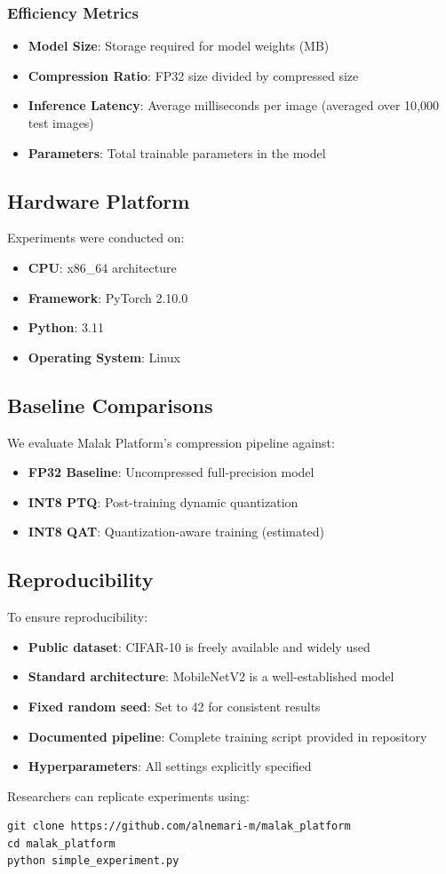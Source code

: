 \subsubsection{Efficiency Metrics}
\begin{itemize}
\item \textbf{Model Size}: Storage required for model weights (MB)
\item \textbf{Compression Ratio}: FP32 size divided by compressed size
\item \textbf{Inference Latency}: Average milliseconds per image (averaged over 10,000 test images)
\item \textbf{Parameters}: Total trainable parameters in the model
\end{itemize}

\subsection{Hardware Platform}

Experiments were conducted on:
\begin{itemize}
\item \textbf{CPU}: x86\_64 architecture
\item \textbf{Framework}: PyTorch 2.10.0
\item \textbf{Python}: 3.11
\item \textbf{Operating System}: Linux
\end{itemize}

\subsection{Baseline Comparisons}

We evaluate Malak Platform's compression pipeline against:
\begin{itemize}
\item \textbf{FP32 Baseline}: Uncompressed full-precision model
\item \textbf{INT8 PTQ}: Post-training dynamic quantization
\item \textbf{INT8 QAT}: Quantization-aware training (estimated)
\end{itemize}

\subsection{Reproducibility}

To ensure reproducibility:
\begin{itemize}
\item \textbf{Public dataset}: CIFAR-10 is freely available and widely used
\item \textbf{Standard architecture}: MobileNetV2 is a well-established model
\item \textbf{Fixed random seed}: Set to 42 for consistent results
\item \textbf{Documented pipeline}: Complete training script provided in repository
\item \textbf{Hyperparameters}: All settings explicitly specified
\end{itemize}

Researchers can replicate experiments using:
\begin{verbatim}
git clone https://github.com/alnemari-m/malak_platform
cd malak_platform
python simple_experiment.py
\end{verbatim}
